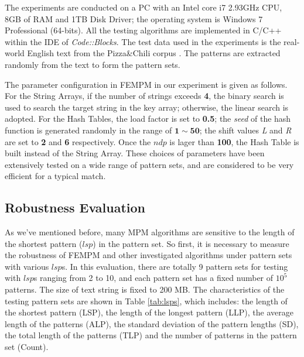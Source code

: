 The experiments are conducted on a PC with an Intel core i7 2.93GHz
CPU, 8GB of RAM and 1TB Disk Driver; the operating system is Windows 7
Professional (64-bits). All the testing algorithms are implemented in
C/C++ within the IDE of \emph{Code::Blocks}. The test data used in the
experiments is the real-world English text from the Pizza\;\&\;Chili
corpus \cite{pizzachil}. The patterns are extracted randomly from the
text to form the pattern sets.

The parameter configuration in \textsf{FEMPM} in our experiment is
given as follows. For the String Arrays, if the number of strings
exceeds \textbf{4}, the binary search is used to search the target
string in the key array; otherwise, the linear search is adopted. For
the Hash Tables, the load factor is set to \textbf{0.5}; the
\emph{seed} of the hash function is generated randomly in the range of
$\mathbf{1} \sim \mathbf{50}$; the shift values \emph{L} and \emph{R}
are set to \textbf{2} and \textbf{6} respectively. Once the $ndp$ is
lager than \textbf{100}, the Hash Table is built instead of the String
Array. These choices of parameters have been extensively tested on a
wide range of pattern sets, and are considered to be very efficient
for a typical match.

\subsection{Robustness Evaluation}

As we've mentioned before, many MPM algorithms are sensitive to the
length of the shortest pattern ($lsp$) in the pattern set. So first,
it is necessary to measure the robustness of \textsf{FEMPM} and other
investigated algorithms under pattern sets with various $lsp$s. In
this evaluation, there are totally 9 pattern sets for testing with
$lsp$s ranging from 2 to 10, and each pattern set has a fixed number
of $10^5$ patterns. The size of text string is fixed to 200 MB. The
characteristics of the testing pattern sets are shown in Table
\ref{tab:lsps}, which includes: the length of the shortest pattern
(LSP), the length of the longest pattern (LLP), the average length of
the patterns (ALP), the standard deviation of the pattern lengths
(SD), the total length of the patterns (TLP) and the number of
patterns in the pattern set (Count).

